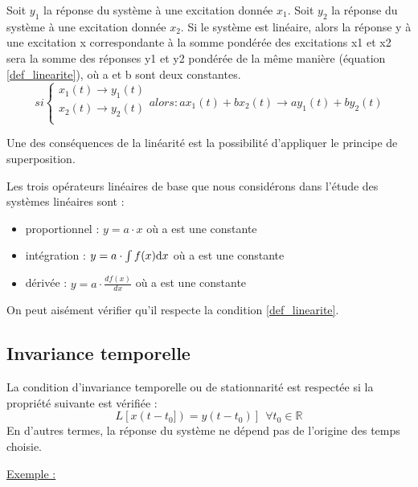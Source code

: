 \documentclass[]{book}
\begin{document}
{	Soit $y_{1}$ la réponse du système à une excitation donnée $x_{1}$. Soit $y_{2}$ la réponse du système à une excitation donnée $x_{2}$. Si le système est linéaire, alors la réponse y à une excitation x correspondante à la somme pondérée des excitations x1 et x2 sera la somme des réponses y1 et y2 pondérée de la même manière (équation \ref{def_linearite}), où a et b sont deux constantes.
	\begin{equation}\label{def_linearite}
	si    \left \{
	\begin{array}{l}
	x_{1}(t)\rightarrow y_{1}(t)  \\
	x_{2}(t)\rightarrow y_{2}(t)   \\
	\end{array}
	\right . alors: ax_{1}(t)+bx_{2}(t)\rightarrow ay_{1}(t)+by_{2}(t)
	\end{equation}
	
	
	Une des conséquences de la linéarité est la possibilité d'appliquer le principe de superposition.
	
	Les trois opérateurs linéaires de base que nous considérons dans l'étude des systèmes linéaires sont :
	\begin{itemize}
		\item proportionnel : $y = a\cdot x$ où a est une constante 
		\item intégration : $y = a\cdot \int f(x) \mathrm{d} x $ où a est une constante
		\item dérivée : $y = a\cdot \frac{df(x)}{dx} $ où a est une constante
	\end{itemize}
	On peut aisément vérifier qu'il respecte la condition \ref{def_linearite}.
	
	\subsection{Invariance temporelle}
	La condition d'invariance temporelle ou de stationnarité est respectée si la propriété suivante est vérifiée :
	\begin{equation}
	L[x(t-t_{0}]) = y(t-t_{0})]   ~~\forall t_{0} \in \mathbb{R}
	\end{equation}
	En d'autres termes, la réponse du système ne dépend pas de l'origine des temps choisie.
	
	\vspace{1\baselineskip}
	\underline{Exemple :}
	\vspace{0.5\baselineskip}
	

}
\end{document}
